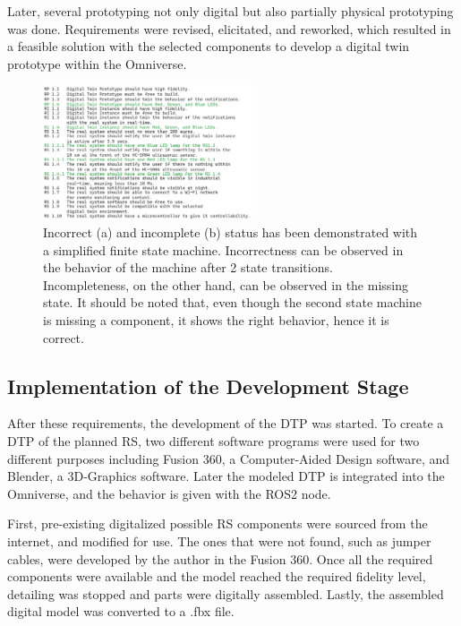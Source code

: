\documentclass[conference]{IEEEtran}
\begin{document}
    Later, several prototyping not only digital but also partially physical prototyping was done. 
    Requirements were revised, elicitated, and reworked, which resulted in a feasible solution with the selected components to develop a digital twin prototype within the Omniverse.
    
    \begin{figure}[htbp]
        \centering
        \includegraphics[width=0.55\textwidth]{Requirements.png}
        \caption{Incorrect (a) and incomplete (b) status has been demonstrated with a simplified finite state machine. Incorrectness can be observed in the behavior 
        of the machine after 2 state transitions. Incompleteness, on the other hand, can be observed in the missing state. It should be noted that, even though the second state machine is missing a 
        component, it shows the right behavior, hence it is correct.}\label{fig:Requirements}
    \end{figure}

    \subsection{Implementation of the Development Stage}
    After these requirements, the development of the DTP was started. To create a DTP of the planned RS, two different software programs were used for two different purposes including Fusion 360, 
    a Computer-Aided Design software, and Blender, a 3D-Graphics software. Later the modeled DTP is integrated into the Omniverse, and the behavior is given with the ROS2 node.

    First, pre-existing digitalized possible RS components were sourced from the internet, and modified for use. The ones that were not found, such as jumper cables, were developed by the author 
    in the Fusion 360. Once all the required components were available and the model reached the required fidelity level, detailing was stopped and parts were digitally assembled. 
    Lastly, the assembled digital model was converted to a .fbx file.
\end{document}

